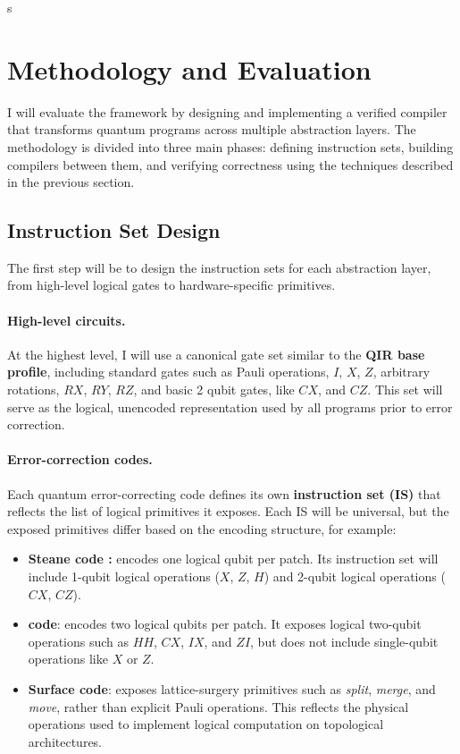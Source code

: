 s\section{Methodology and Evaluation}

I will evaluate the framework by designing and implementing a verified compiler that transforms quantum programs across multiple abstraction layers.  
The methodology is divided into three main phases: defining instruction sets, building compilers between them, and verifying correctness using the techniques described in the previous section.

\subsection{Instruction Set Design}

The first step will be to design the instruction sets for each abstraction layer, from high-level logical gates to hardware-specific primitives.

\paragraph{High-level circuits.}
At the highest level, I will use a canonical gate set similar to the \textbf{QIR base profile}, including standard gates such as Pauli operations,  \(I\), \(X\), \(Z\), arbitrary rotations, \(RX\), \(RY\), \(RZ\), and basic 2 qubit gates, like \(CX\), and \(CZ\).  
This set will serve as the logical, unencoded representation used by all programs prior to error correction.

\paragraph{Error-correction codes.}
Each quantum error-correcting code defines its own \textbf{instruction set (IS)} that reflects the list of logical primitives it exposes.  
Each IS will be universal, but the exposed primitives differ based on the encoding structure, for example:
\begin{itemize}
    \item \textbf{Steane code :} encodes one logical qubit per patch.  
    Its instruction set will include 1-qubit logical operations (\(X\), \(Z\), \(H\)) and 2-qubit logical operations (\(CX\), \(CZ\)).
    \item \textbf{ code}: encodes two logical qubits per patch.  
    It exposes logical two-qubit operations such as \(HH\), \(CX\), \(IX\), and \(ZI\), but does not include single-qubit operations like \(X\) or \(Z\).
    \item \textbf{Surface code}: exposes lattice-surgery primitives such as \emph{split}, \emph{merge}, and \emph{move}, rather than explicit Pauli operations.  
    This reflects the physical operations used to implement logical computation on topological architectures.
\end{itemize}

